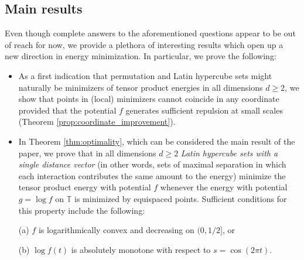 \documentclass[a4paper,12pt]{article}
\numberwithin{equation}{section}
\theoremstyle{definition}
\begin{document}
\subsection{Main results}
Even though complete answers to the aforementioned questions appear to be out of reach for now, we provide a plethora of interesting results 
which open up a new direction in energy minimization. In particular, we prove the following:

\begin{itemize}
\item As a first indication that permutation  and Latin hypercube sets might naturally be minimizers of tensor product energies in all dimensions $d\ge 2$, we show that points in (local) minimizers cannot coincide in any coordinate provided that the potential $f$ generates sufficient repulsion at small scales (Theorem \ref{prop:coordinate_improvement}). 
\item  In Theorem \ref{thm:optimality}, which can be considered the main result of the paper, we prove that  in all dimensions $d\ge 2$ {\emph{Latin hypercube sets with a single distance vector}} (in other words, sets of maximal separation in which each interaction contributes the same amount to the energy) minimize the tensor product energy with potential $f$  whenever the energy with potential $g= \log f $ on $\mathbb T$ is minimized by equispaced points. Sufficient conditions for this property include the following:  

(a) $f$ is logarithmically convex and decreasing on $(0,1/2]$, or 

(b) $\log f(t)$ %
is absolutely monotone with respect to $s = \cos (2\pi t)$.


\end{itemize}
\end{document}
